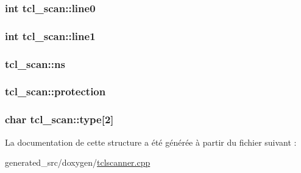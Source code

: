 \subsubsection[{line0}]{\setlength{\rightskip}{0pt plus 5cm}int tcl\+\_\+scan\+::line0}\label{structtcl__scan_a858b5f4a6e03f1db3e88b8413218ab04}
\hypertarget{structtcl__scan_aaec63dc6756ade838f966b120cf10eb8}{}
\subsubsection[{line1}]{\setlength{\rightskip}{0pt plus 5cm}int tcl\+\_\+scan\+::line1}\label{structtcl__scan_aaec63dc6756ade838f966b120cf10eb8}
\hypertarget{structtcl__scan_a1f532136748d05b901b68d1ca71ae66b}{}
\subsubsection[{ns}]{ tcl\+\_\+scan\+::ns}\label{structtcl__scan_a1f532136748d05b901b68d1ca71ae66b}
\hypertarget{structtcl__scan_aef45ec997f24054aa18863a2da0feffd}{}
\subsubsection[{protection}]{ tcl\+\_\+scan\+::protection}\label{structtcl__scan_aef45ec997f24054aa18863a2da0feffd}
\hypertarget{structtcl__scan_a1e8465613aa17a4634c16633a479ced1}{}
\subsubsection[{type}]{\setlength{\rightskip}{0pt plus 5cm}char tcl\+\_\+scan\+::type\mbox{[}2\mbox{]}}\label{structtcl__scan_a1e8465613aa17a4634c16633a479ced1}


La documentation de cette structure a été générée à partir du fichier suivant \+:\begin{DoxyCompactItemize}
\item 
generated\+\_\+src/doxygen/\hyperlink{tclscanner_8cpp}{tclscanner.\+cpp}\end{DoxyCompactItemize}
